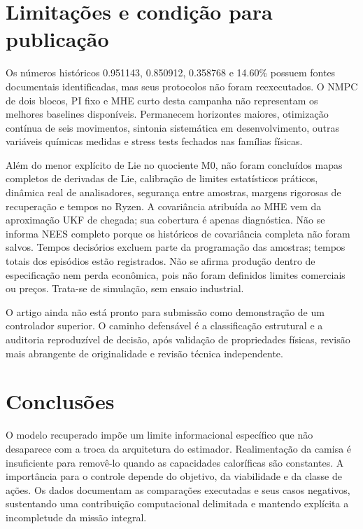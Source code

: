 \documentclass[
  11pt,
]{article}
\begin{document}
\hypertarget{limitauxe7uxf5es-e-condiuxe7uxe3o-para-publicauxe7uxe3o}{%
\section{Limitações e condição para
publicação}\label{limitauxe7uxf5es-e-condiuxe7uxe3o-para-publicauxe7uxe3o}}

Os números históricos 0.951143, 0.850912, 0.358768 e 14.60\% possuem
fontes documentais identificadas, mas seus protocolos não foram
reexecutados. O NMPC de dois blocos, PI fixo e MHE curto desta campanha
não representam os melhores baselines disponíveis. Permanecem horizontes
maiores, otimização contínua de seis movimentos, sintonia sistemática em
desenvolvimento, outras variáveis químicas medidas e stress tests
fechados nas famílias físicas.

Além do menor explícito de Lie no quociente M0, não foram concluídos
mapas completos de derivadas de Lie, calibração de limites estatísticos
práticos, dinâmica real de analisadores, segurança entre amostras,
margens rigorosas de recuperação e tempos no Ryzen. A covariância
atribuída ao MHE vem da aproximação UKF de chegada; sua cobertura é
apenas diagnóstica. Não se informa NEES completo porque os históricos de
covariância completa não foram salvos. Tempos decisórios excluem parte
da programação das amostras; tempos totais dos episódios estão
registrados. Não se afirma produção dentro de especificação nem perda
econômica, pois não foram definidos limites comerciais ou preços.
Trata-se de simulação, sem ensaio industrial.

O artigo ainda não está pronto para submissão como demonstração de um
controlador superior. O caminho defensável é a classificação estrutural
e a auditoria reproduzível de decisão, após validação de propriedades
físicas, revisão mais abrangente de originalidade e revisão técnica
independente.

\hypertarget{conclusuxf5es}{%
\section{Conclusões}\label{conclusuxf5es}}

O modelo recuperado impõe um limite informacional específico que não
desaparece com a troca da arquitetura do estimador. Realimentação da
camisa é insuficiente para removê-lo quando as capacidades caloríficas
são constantes. A importância para o controle depende do objetivo, da
viabilidade e da classe de ações. Os dados documentam as comparações
executadas e seus casos negativos, sustentando uma contribuição
computacional delimitada e mantendo explícita a incompletude da missão
integral.
\end{document}
